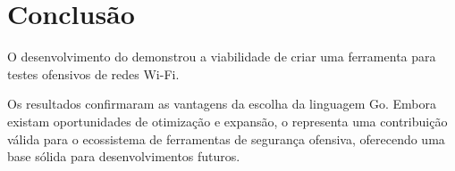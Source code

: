 \section{Conclusão}

O desenvolvimento do \offscan demonstrou a viabilidade de criar uma ferramenta para testes ofensivos de redes Wi-Fi. 

Os resultados confirmaram as vantagens da escolha da linguagem Go. Embora existam oportunidades de otimização e expansão, o \offscan representa uma contribuição válida para o ecossistema de ferramentas de segurança ofensiva, oferecendo uma base sólida para desenvolvimentos futuros.